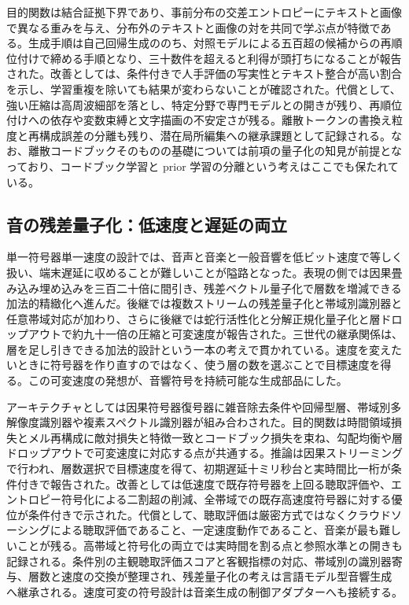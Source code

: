 \documentclass[lualatex,a4paper,10pt]{jlreq}
\begin{document}
目的関数は結合証拠下界であり、事前分布の交差エントロピーにテキストと画像で異なる重みを与え、分布外のテキストと画像の対を共同で学ぶ点が特徴である\autocite{btd005}。生成手順は自己回帰生成ののち、対照モデルによる五百超の候補からの再順位付けで締める手順となり、三十数件を超えると利得が頭打ちになることが報告された。改善としては、条件付きで人手評価の写実性とテキスト整合が高い割合を示し、学習重複を除いても結果が変わらないことが確認された\autocite{btd005}。代償として、強い圧縮は高周波細部を落とし、特定分野で専門モデルとの開きが残り、再順位付けへの依存や変数束縛と文字描画の不安定さが残る。離散トークンの書換え粒度と再構成誤差の分離も残り、潜在局所編集への継承課題として記録される。なお、離散コードブックそのものの基礎については前項の量子化の知見が前提となっており、コードブック学習と prior 学習の分離という考えはここでも保たれている\autocite{btd002}。

\subsection{音の残差量子化：低速度と遅延の両立}
単一符号器単一速度の設計では、音声と音楽と一般音響を低ビット速度で等しく扱い、端末遅延に収めることが難しいことが隘路となった。表現の側では因果畳み込み埋め込みを三百二十倍に間引き、残差ベクトル量子化で層数を増減できる加法的精緻化へ進んだ\autocite{btd006}。後継では複数ストリームの残差量子化と帯域別識別器と任意帯域対応が加わり\autocite{btd007}、さらに後継では蛇行活性化と分解正規化量子化と層ドロップアウトで約九十一倍の圧縮と可変速度が報告された\autocite{btd008}。三世代の継承関係は、層を足し引きできる加法的設計という一本の考えで貫かれている。速度を変えたいときに符号器を作り直すのではなく、使う層の数を選ぶことで目標速度を得る。この可変速度の発想が、音響符号を持続可能な生成部品にした。

アーキテクチャとしては因果符号器復号器に雑音除去条件や回帰型層、帯域別多解像度識別器や複素スペクトル識別器が組み合わされた\autocite{btd006,btd007}。目的関数は時間領域損失とメル再構成に敵対損失と特徴一致とコードブック損失を束ね、勾配均衡や層ドロップアウトで可変速度に対応する点が共通する\autocite{btd007,btd008}。推論は因果ストリーミングで行われ、層数選択で目標速度を得て、初期遅延十ミリ秒台と実時間比一桁が条件付きで報告された\autocite{btd006}。改善としては低速度で既存符号器を上回る聴取評価や、エントロピー符号化による二割超の削減、全帯域での既存高速度符号器に対する優位が条件付きで示された\autocite{btd007,btd008}。代償として、聴取評価は厳密方式ではなくクラウドソーシングによる聴取評価であること、一定速度動作であること、音楽が最も難しいことが残る。高帯域と符号化の両立では実時間を割る点と参照水準との開きも記録される。条件別の主観聴取評価スコアと客観指標の対応、帯域別の識別器寄与、層数と速度の交換が整理され、残差量子化の考えは言語モデル型音響生成へ継承される。速度可変の符号設計は音楽生成の制御アダプターへも接続する。
\end{document}
